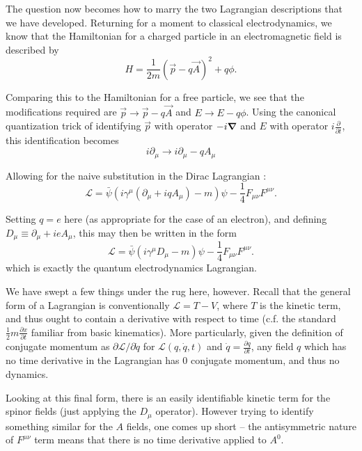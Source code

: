 The question now becomes how to marry the two Lagrangian descriptions that we have developed.
Returning for a moment to classical electrodynamics, we know that the Hamiltonian for a charged 
particle in an electromagnetic field is described by 
\begin{equation}
H = \frac{1}{2m}(\vec{p} - q\vec{A})^2 + q\phi.
\end{equation}

Comparing this to the Hamiltonian for a free particle, we see that the modifications required 
are $\vec{p} \rightarrow \vec{p} - q\vec{A}$ and $E\rightarrow E- q\phi$. Using the canonical 
quantization trick of identifying $\vec{p}$ with operator $-i\grad$ and $E$ with operator 
$i\frac{\partial}{\partial t}$, this identification becomes
\begin{equation}
i\partial_{\mu} \rightarrow i\partial_{\mu}-q A_{\mu}
\end{equation}

Allowing for the naive substitution in the Dirac Lagrangian :
\begin{equation}
\mathcal{L} = \bar{\psi}(i\gamma^{\mu}(\partial_{\mu}+iq A_{\mu}) - m)\psi -\frac{1}{4} F_{\mu\nu}F^{\mu\nu}.
\end{equation}

Setting $q=e$ here (as appropriate for the case of an electron), and defining 
$D_{\mu} \equiv \partial_{\mu} + ieA_{\mu}$, this may then be written in the form
\begin{equation}
\mathcal{L} = \bar{\psi}(i\gamma^{\mu}D_{\mu} - m)\psi -\frac{1}{4} F_{\mu\nu}F^{\mu\nu}.
\end{equation}
which is exactly the quantum electrodynamics Lagrangian.

We have swept a few things under the rug here, however. Recall that the general 
form of a Lagrangian is conventionally $\mathcal{L} = T - V$, where $T$ is the kinetic term, 
and thus ought to contain a derivative with respect to time (c.f. the standard 
$\frac{1}{2}m\frac{\partial x}{\partial t}$ familiar from basic kinematics). More particularly,
given the definition of conjugate momentum as $\partial \mathcal{L}/\partial \dot{q}$ for 
$\mathcal{L}(q, \dot{q}, t)$ and $\dot{q} = \frac{\partial q}{\partial t}$, any field $q$ which 
has no time derivative in the Lagrangian has $0$ conjugate momentum, and thus no dynamics. 

Looking at this final form, there is an easily identifiable kinetic term for the spinor fields (just applying 
the $D_{\mu}$ operator). However trying to identify something similar for the $A$ fields, one 
comes up short -- the antisymmetric nature of $F^{\mu\nu}$ term means that there
is no time derivative applied to $A^0$.

